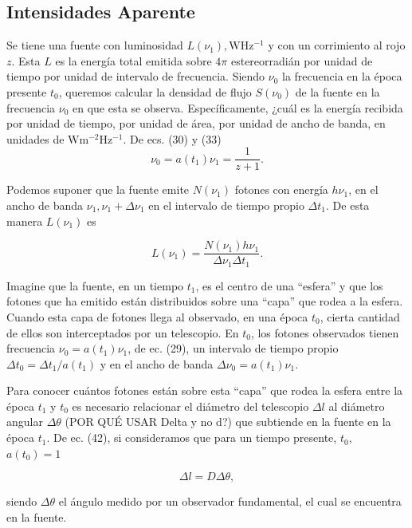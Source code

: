 \documentclass{article}
\begin{document}
\subsection{Intensidades Aparente}

Se tiene una fuente con luminosidad $L(\nu_1), \mathrm{W Hz^{-1}}$ y con un corrimiento al rojo $z$. Esta $L$ es la energía total emitida sobre $4 \pi$ estereorradián por unidad de tiempo por unidad de intervalo de frecuencia. Siendo $\nu_0$ la frecuencia en la época presente $t_0$, queremos calcular la densidad de flujo $S(\nu_0)$ de la fuente en la frecuencia $\nu_0$ en que esta se observa. Específicamente, ¿cuál es la energía recibida por unidad de tiempo, por unidad de área, por unidad de ancho de banda, en unidades de $\mathrm{W m^{-2} Hz^{-1}}$. De ecs. (30) y (33) 
    $$\nu_0 = a(t_1) \nu_1 = \frac{1}{z+1}.$$

Podemos suponer que la fuente emite $N(\nu_1)$ fotones con energía $h \nu_1$, en el ancho de banda $\nu_1, \nu_1 + \Delta \nu_1$ en el intervalo de tiempo propio $\Delta t_1$. De esta manera $L(\nu_1)$ es

    \begin{equation}
        L(\nu_1) = \frac{N(\nu_1) h \nu_1 }{\Delta \nu_1 \Delta t_1}.
    \end{equation}
    
    Imagine que la fuente, en un tiempo $t_1$, es el centro de una ``esfera'' y que los fotones que ha emitido están distribuidos sobre una ``capa'' que rodea a la esfera. Cuando esta capa de fotones llega al observado, en una época $t_0$, cierta cantidad de ellos son interceptados por un telescopio. En $t_0$, los fotones observados tienen frecuencia $\nu_0 = a(t_1) \nu_1$, de ec. (29), un intervalo de tiempo propio $ \Delta t_0 = \Delta t_1/a(t_1)$ y en el ancho de banda $ \Delta \nu_0 = a(t_1) \nu_1$.

    Para conocer cuántos fotones están sobre esta ``capa'' que rodea la esfera entre la época $t_1$ y $t_0$ es necesario relacionar el diámetro del telescopio $\Delta l$  al diámetro angular $\Delta \theta$ (POR QUÉ USAR Delta y no d?) que subtiende en la fuente en la época $t_1$. De ec. (42), si consideramos que para un tiempo presente, $t_0$, $a(t_0) = 1$
    
    \begin{equation}
        \Delta l = D \Delta \theta,
    \end{equation}
    
    siendo $\Delta \theta$ el ángulo medido por un observador fundamental, el cual se encuentra en la fuente. 
    
\end{document}
